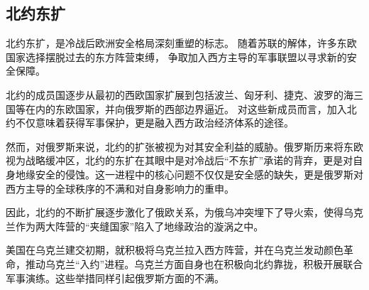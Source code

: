 \subsection{北约东扩}
北约东扩，是冷战后欧洲安全格局深刻重塑的标志。
随着苏联的解体，许多东欧国家选择摆脱过去的东方阵营束缚，
争取加入西方主导的军事联盟以寻求新的安全保障。

北约的成员国逐步从最初的西欧国家扩展到包括波兰、匈牙利、捷克、波罗的海三国等在内的东欧国家，并向俄罗斯的西部边界逼近。
对这些新成员而言，加入北约不仅意味着获得军事保护，更是融入西方政治经济体系的途径。

然而，对俄罗斯来说，北约的扩张被视为对其安全利益的威胁。俄罗斯历来将东欧视为战略缓冲区，北约的东扩在其眼中是对冷战后“不东扩”承诺的背弃，更是对自身地缘安全的侵蚀。这一进程中的核心问题不仅仅是安全感的缺失，更是俄罗斯对西方主导的全球秩序的不满和对自身影响力的重申。

因此，北约的不断扩展逐步激化了俄欧关系，为俄乌冲突埋下了导火索，使得乌克兰作为两大阵营的“夹缝国家”陷入了地缘政治的漩涡之中。

美国在乌克兰建交初期，就积极将乌克兰拉入西方阵营，并在乌克兰发动颜色革命，推动乌克兰“入约”进程。乌克兰方面自身也在积极向北约靠拢，积极开展联合军事演练。\cite{_19922020_2023}这些举措同样引起俄罗斯方面的不满。